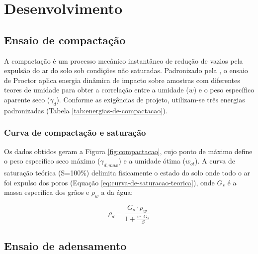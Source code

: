 \chapter{Desenvolvimento}

\section{Ensaio de compactação}

A compactação é um processo mecânico instantâneo de redução de vazios pela expulsão do ar do solo sob condições não saturadas. Padronizado pela , o ensaio de Proctor aplica energia dinâmica de impacto sobre amostras com diferentes teores de umidade para obter a correlação entre a umidade ($w$) e o peso específico aparente seco ($\gamma_d$). Conforme as exigências de projeto, utilizam-se três energias padronizadas (Tabela \ref{tab:energias-de-compactacao}).



\subsection{Curva de compactação e saturação}

Os dados obtidos geram a Figura \ref{fig:compactacao}, cujo ponto de máximo define o peso específico seco máximo ($\gamma_{d,max}$) e a umidade ótima ($w_{ot}$). A curva de saturação teórica (S=100\%) delimita fisicamente o estado do solo onde todo o ar foi expulso dos poros (Equação \ref{eq:curva-de-saturacao-teorica}), onde $G_s$ é a massa específica dos grãos e $\rho_w$ a da água:

$$\rho_d=\frac{G_s \cdot \rho_w}{1+\frac{w\cdot G_s}{S}}$$
\label{eq:curva-de-saturacao-teorica}











\section{Ensaio de adensamento}



